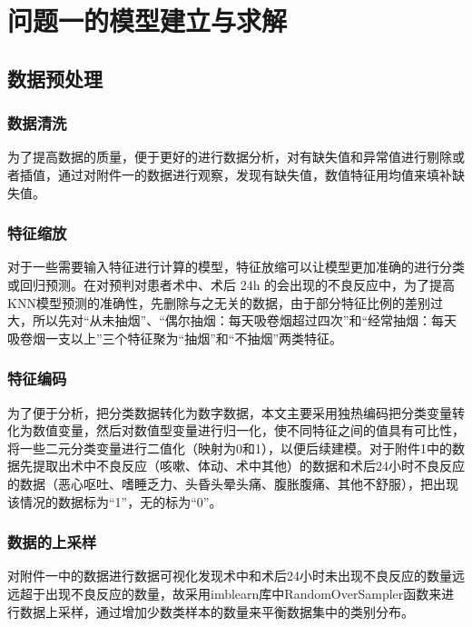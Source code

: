 \section{问题一的模型建立与求解}

\subsection{数据预处理}

\subsubsection{数据清洗}

为了提高数据的质量，便于更好的进行数据分析，对有缺失值和异常值进行剔除或者插值，通过对附件一的数据进行观察，发现有缺失值，数值特征用均值来填补缺失值。

\subsubsection{特征缩放}

对于一些需要输入特征进行计算的模型，特征放缩可以让模型更加准确的进行分类或回归预测。在对预判对患者术中、术后 24h 的会出现的不良反应中，为了提高KNN模型预测的准确性，先删除与之无关的数据，由于部分特征比例的差别过大，所以先对“从未抽烟”、“偶尔抽烟：每天吸卷烟超过四次”和“经常抽烟：每天吸卷烟一支以上”三个特征聚为“抽烟”和“不抽烟”两类特征。

\subsubsection{特征编码}

为了便于分析，把分类数据转化为数字数据，本文主要采用独热编码把分类变量转化为数值变量，然后对数值型变量进行归一化，使不同特征之间的值具有可比性，将一些二元分类变量进行二值化（映射为0和1），以便后续建模。对于附件1中的数据先提取出术中不良反应（咳嗽、体动、术中其他）的数据和术后24小时不良反应的数据（恶心呕吐、嗜睡乏力、头昏头晕头痛、腹胀腹痛、其他不舒服），把出现该情况的数据标为“1”，无的标为“0”。

\subsubsection{数据的上采样}

对附件一中的数据进行数据可视化发现术中和术后24小时未出现不良反应的数量远远超于出现不良反应的数量，故采用imblearn库中RandomOverSampler函数来进行数据上采样，通过增加少数类样本的数量来平衡数据集中的类别分布。

